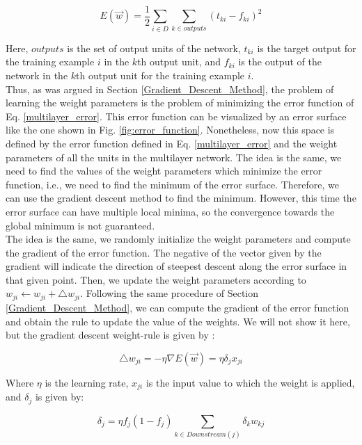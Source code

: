 \begin{equation}
\label{multilayer_error}
	E(\vec{w})=\frac{1}{2} \sum_{i \in D} \sum_{k \in outputs} (t_{ki}-f_{ki})^{2}
\end{equation}

Here, $outputs$ is the set of output units of the network, $t_{ki}$ is the target output for the training example $i$ in the $k$th output unit, and  $f_{ki}$ is the output of the network in the $k$th output unit for the training example $i$.\\

Thus, as was argued in Section \ref{Gradient_Descent_Method}, the problem of learning the weight parameters is the problem of minimizing the error function of Eq. \ref{multilayer_error}. This error function can be visualized by an error surface like the one shown in Fig. \ref{fig:error_function}. Nonetheless, now this space is defined by the error function defined in Eq. \ref{multilayer_error} and the weight parameters of all the units in the multilayer network. The idea is the same, we need to find the values of the weight parameters which minimize the error function, i.e., we need to find the minimum of the error surface. Therefore, we can use the gradient descent method to find the minimum. However, this time the error surface can have multiple local minima, so the convergence towards the global minimum is not guaranteed.\\

The idea is the same, we randomly initialize the weight parameters and compute the gradient of the error function. The negative of the vector given by the gradient will indicate the direction of steepest descent along the error surface in that given point. Then, we update the weight parameters according to $w_{ji} \leftarrow w_{ji} + \triangle w_{ji}$. Following the same procedure of Section \ref{Gradient_Descent_Method}, we can compute the gradient of the error function and obtain the rule to update the value of the weights. We will not show it here, but the gradient descent weight-rule is given by \cite{machine_mitchell}:

\begin{equation}
\label{backpropagation}
	 \triangle w_{ji} =-\eta \nabla E(\vec{w}) = \eta \delta_{j} x_{ji}
\end{equation}

Where $\eta$ is the learning rate, $ x_{ji}$ is the input value to which the weight is applied, and $\delta_{j}$ is given by:

\begin{equation}
\label{rule_gradient_descent}
	 \delta_{j} =  \eta f_{j} (1-f_{j})  \sum_{k \in Downstream(j)} \delta_{k} w_{kj}
\end{equation}

